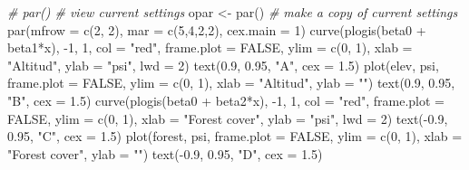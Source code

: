 \documentclass[
]{book}
\newenvironment{Shaded}{\begin{snugshade}}{\end{snugshade}}
\newcommand{\AttributeTok}[1]{\textcolor[rgb]{0.77,0.63,0.00}{#1}}
\newcommand{\CommentTok}[1]{\textcolor[rgb]{0.56,0.35,0.01}{\textit{#1}}}
\newcommand{\ConstantTok}[1]{\textcolor[rgb]{0.00,0.00,0.00}{#1}}
\newcommand{\DecValTok}[1]{\textcolor[rgb]{0.00,0.00,0.81}{#1}}
\newcommand{\FloatTok}[1]{\textcolor[rgb]{0.00,0.00,0.81}{#1}}
\newcommand{\FunctionTok}[1]{\textcolor[rgb]{0.00,0.00,0.00}{#1}}
\newcommand{\NormalTok}[1]{#1}
\newcommand{\OtherTok}[1]{\textcolor[rgb]{0.56,0.35,0.01}{#1}}
\newcommand{\SpecialCharTok}[1]{\textcolor[rgb]{0.00,0.00,0.00}{#1}}
\newcommand{\StringTok}[1]{\textcolor[rgb]{0.31,0.60,0.02}{#1}}
\begin{document}
\begin{Shaded}
\begin{Highlighting}[]
\CommentTok{\# par()              \# view current settings}
\NormalTok{opar }\OtherTok{\textless{}{-}} \FunctionTok{par}\NormalTok{()      }\CommentTok{\# make a copy of current settings}
\FunctionTok{par}\NormalTok{(}\AttributeTok{mfrow =} \FunctionTok{c}\NormalTok{(}\DecValTok{2}\NormalTok{, }\DecValTok{2}\NormalTok{), }\AttributeTok{mar =} \FunctionTok{c}\NormalTok{(}\DecValTok{5}\NormalTok{,}\DecValTok{4}\NormalTok{,}\DecValTok{2}\NormalTok{,}\DecValTok{2}\NormalTok{), }\AttributeTok{cex.main =} \DecValTok{1}\NormalTok{)}
\FunctionTok{curve}\NormalTok{(}\FunctionTok{plogis}\NormalTok{(beta0 }\SpecialCharTok{+}\NormalTok{ beta1}\SpecialCharTok{*}\NormalTok{x), }\SpecialCharTok{{-}}\DecValTok{1}\NormalTok{, }\DecValTok{1}\NormalTok{, }\AttributeTok{col =} \StringTok{"red"}\NormalTok{, }\AttributeTok{frame.plot =} \ConstantTok{FALSE}\NormalTok{, }\AttributeTok{ylim =} \FunctionTok{c}\NormalTok{(}\DecValTok{0}\NormalTok{, }\DecValTok{1}\NormalTok{),}
      \AttributeTok{xlab =} \StringTok{"Altitud"}\NormalTok{, }\AttributeTok{ylab =} \StringTok{"psi"}\NormalTok{, }\AttributeTok{lwd =} \DecValTok{2}\NormalTok{)}
\FunctionTok{text}\NormalTok{(}\FloatTok{0.9}\NormalTok{, }\FloatTok{0.95}\NormalTok{, }\StringTok{"A"}\NormalTok{, }\AttributeTok{cex =} \FloatTok{1.5}\NormalTok{)}
\FunctionTok{plot}\NormalTok{(elev, psi, }\AttributeTok{frame.plot =} \ConstantTok{FALSE}\NormalTok{, }\AttributeTok{ylim =} \FunctionTok{c}\NormalTok{(}\DecValTok{0}\NormalTok{, }\DecValTok{1}\NormalTok{), }\AttributeTok{xlab =} \StringTok{"Altitud"}\NormalTok{, }\AttributeTok{ylab =} \StringTok{""}\NormalTok{)}
\FunctionTok{text}\NormalTok{(}\FloatTok{0.9}\NormalTok{, }\FloatTok{0.95}\NormalTok{, }\StringTok{"B"}\NormalTok{, }\AttributeTok{cex =} \FloatTok{1.5}\NormalTok{)}
\FunctionTok{curve}\NormalTok{(}\FunctionTok{plogis}\NormalTok{(beta0 }\SpecialCharTok{+}\NormalTok{ beta2}\SpecialCharTok{*}\NormalTok{x), }\SpecialCharTok{{-}}\DecValTok{1}\NormalTok{, }\DecValTok{1}\NormalTok{, }\AttributeTok{col =} \StringTok{"red"}\NormalTok{, }\AttributeTok{frame.plot =} \ConstantTok{FALSE}\NormalTok{, }\AttributeTok{ylim =} \FunctionTok{c}\NormalTok{(}\DecValTok{0}\NormalTok{, }\DecValTok{1}\NormalTok{), }
      \AttributeTok{xlab =} \StringTok{"Forest cover"}\NormalTok{, }\AttributeTok{ylab =} \StringTok{"psi"}\NormalTok{, }\AttributeTok{lwd =} \DecValTok{2}\NormalTok{)}
\FunctionTok{text}\NormalTok{(}\SpecialCharTok{{-}}\FloatTok{0.9}\NormalTok{, }\FloatTok{0.95}\NormalTok{, }\StringTok{"C"}\NormalTok{, }\AttributeTok{cex =} \FloatTok{1.5}\NormalTok{)}
\FunctionTok{plot}\NormalTok{(forest, psi, }\AttributeTok{frame.plot =} \ConstantTok{FALSE}\NormalTok{, }\AttributeTok{ylim =} \FunctionTok{c}\NormalTok{(}\DecValTok{0}\NormalTok{, }\DecValTok{1}\NormalTok{), }\AttributeTok{xlab =} \StringTok{"Forest cover"}\NormalTok{, }\AttributeTok{ylab =} \StringTok{""}\NormalTok{)}
\FunctionTok{text}\NormalTok{(}\SpecialCharTok{{-}}\FloatTok{0.9}\NormalTok{, }\FloatTok{0.95}\NormalTok{, }\StringTok{"D"}\NormalTok{, }\AttributeTok{cex =} \FloatTok{1.5}\NormalTok{)}
\end{Highlighting}
\end{Shaded}
\end{document}
